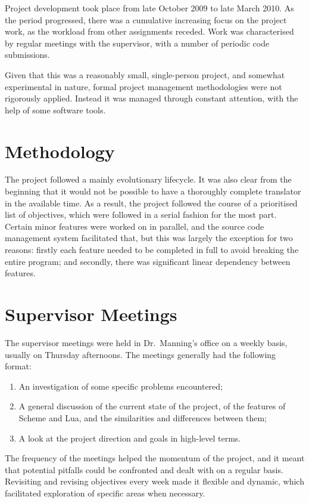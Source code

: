 Project development took place from late October 2009 to late March 2010. As
the period progressed, there was a cumulative increasing focus on the project
work, as the workload from other assignments receded. Work was characterised by
regular meetings with the supervisor, with a number of periodic code
submissions.

Given that this was a reasonably small, single-person project, and somewhat
experimental in nature, formal project management methodologies were not
rigorously applied. Instead it was managed through constant attention, with the
help of some software tools.


\section{Methodology}

The project followed a mainly evolutionary lifecycle. It was also clear from the
beginning that it would not be possible to have a thoroughly complete translator
in the available time.  As a result, the project followed the course of a
prioritised list of objectives, which were followed in a serial fashion for the
most part.  Certain minor features were worked on in parallel, and the source
code management system facilitated that, but this was largely the exception for
two reasons: firstly each feature needed to be completed in full to avoid
breaking the entire program; and secondly, there was significant linear
dependency between features.


\section{Supervisor Meetings}

The supervisor meetings were held in Dr.\ Manning's office on a weekly basis,
usually on Thursday afternoons. The meetings generally had the following format:

\begin{enumerate}
\item An investigation of some specific problems encountered;
\item A general discussion of the current state of the project, of the
features of Scheme and Lua, and the similarities and differences between
them;
\item A look at the project direction and goals in high-level terms.
\end{enumerate}

The frequency of the meetings helped the momentum of the project, and it meant
that potential pitfalls could be confronted and dealt with on a regular basis.
Revisiting and revising objectives every week made it flexible and dynamic,
which facilitated exploration of specific areas when necessary.


